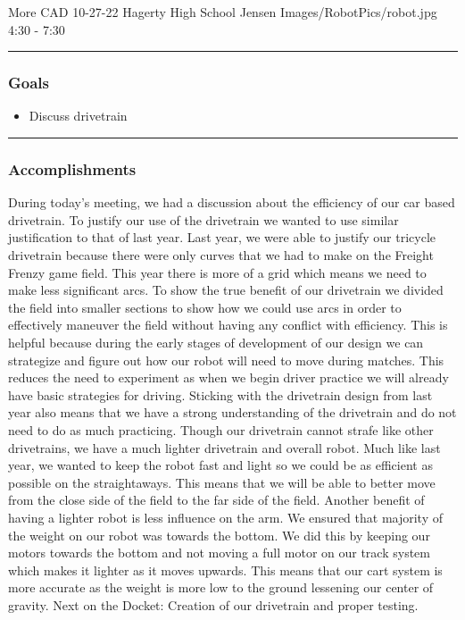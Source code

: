 \insertmeeting 
	{More CAD} 
	{10-27-22}
	{Hagerty High School}
	{Jensen}
	{Images/RobotPics/robot.jpg}
	{4:30 - 7:30}
	
\noindent\hfil\rule{\textwidth}{.4pt}\hfil
\subsubsection*{Goals}
\begin{itemize}
    \item Discuss drivetrain

\end{itemize} 

\noindent\hfil\rule{\textwidth}{.4pt}\hfil

\subsubsection*{Accomplishments}
During today's meeting, we had a discussion about the efficiency of our car based drivetrain. To justify our use of the drivetrain we wanted to use similar justification to that of last year. Last year, we were able to justify our tricycle drivetrain because there were only curves that we had to make on the Freight Frenzy game field. This year there is more of a grid which means we need to make less significant arcs. To show the true benefit of our drivetrain we divided the field into smaller sections to show how we could use arcs in order to effectively maneuver the field without having any conflict with efficiency. This is helpful because during the early stages of development of our design we can strategize and figure out how our robot will need to move during matches. This reduces the need to experiment as when we begin driver practice we will already have basic strategies for driving. Sticking with the drivetrain design from last year also means that we have a strong understanding of the drivetrain and do not need to do as much practicing. Though our drivetrain cannot strafe like other drivetrains, we have a much lighter drivetrain and overall robot. Much like last year, we wanted to keep the robot fast and light so we could be as efficient as possible on the straightaways. This means that we will be able to better move from the close side of the field to the far side of the field. Another benefit of having a lighter robot is less influence on the arm. We ensured that majority of the weight on our robot was towards the bottom. We did this by keeping our motors towards the bottom and not moving a full motor on our track system which makes it lighter as it moves upwards. This means that our cart system is more accurate as the weight is more low to the ground lessening our center of gravity.
Next on the Docket: Creation of our drivetrain and proper testing.

